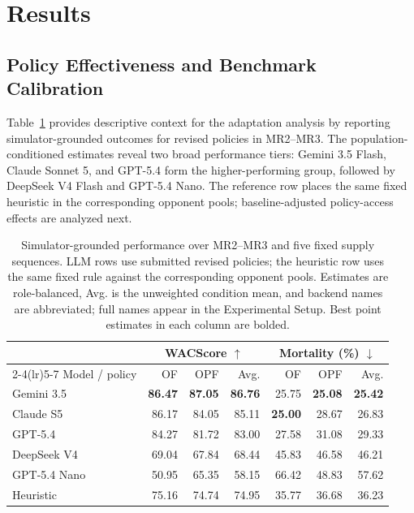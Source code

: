 \documentclass[letterpaper]{article} %
\begin{document}
\section{Results}

\subsection{Policy Effectiveness and Benchmark Calibration}

Table~\ref{tab:outcome-performance} provides descriptive context for the
adaptation analysis by reporting simulator-grounded outcomes for revised
policies in MR2--MR3. The population-conditioned estimates reveal two broad
performance tiers: Gemini 3.5 Flash, Claude Sonnet 5, and GPT-5.4 form the
higher-performing group, followed by DeepSeek V4 Flash and GPT-5.4 Nano.
The reference row places the same fixed heuristic in the corresponding
opponent pools; baseline-adjusted policy-access effects are analyzed next.

\begin{table}[t]
    \centering
    \small
    \setlength{\tabcolsep}{3pt}
    \caption{Simulator-grounded performance over MR2--MR3 and five fixed
    supply sequences. LLM rows use submitted revised policies; the heuristic
    row uses the same fixed rule against the corresponding opponent pools.
    Estimates are role-balanced, Avg. is the unweighted condition mean, and
    backend names are abbreviated; full names appear in the Experimental
    Setup. Best point estimates in each column are bolded.}
    \label{tab:outcome-performance}
    \begin{tabular}{lrrr rrr}
        \toprule
        & \multicolumn{3}{c}{WACScore $\uparrow$}
        & \multicolumn{3}{c}{Mortality (\%) $\downarrow$} \\
        \cmidrule(lr){2-4}\cmidrule(lr){5-7}
        Model / policy & OF & OPF & Avg. & OF & OPF & Avg. \\
        \midrule
        Gemini 3.5 & \textbf{86.47} & \textbf{87.05} & \textbf{86.76}
                   & 25.75 & \textbf{25.08} & \textbf{25.42} \\
        Claude S5  & 86.17 & 84.05 & 85.11 & \textbf{25.00} & 28.67 & 26.83 \\
        GPT-5.4    & 84.27 & 81.72 & 83.00 & 27.58 & 31.08 & 29.33 \\
        DeepSeek V4 & 69.04 & 67.84 & 68.44 & 45.83 & 46.58 & 46.21 \\
        GPT-5.4 Nano & 50.95 & 65.35 & 58.15 & 66.42 & 48.83 & 57.62 \\
        \midrule
        Heuristic & 75.16 & 74.74 & 74.95 & 35.77 & 36.68 & 36.23 \\
        \bottomrule
    \end{tabular}
\end{table}
\end{document}

